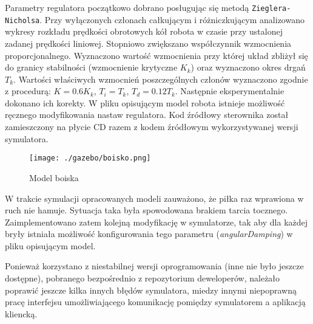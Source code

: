 	Parametry regulatora początkowo dobrano posługując się metodą \texttt{Zieglera-Nicholsa}. Przy wyłączonych członach całkującym i różniczkującym analizowano wykresy rozkładu
	prędkości obrotowych kół robota w czasie przy ustalonej zadanej prędkości liniowej. Stopniowo zwiększano współczynnik wzmocnienia proporcjonalnego. Wyznaczono wartość wzmocnienia
	przy której układ zbliżył się do granicy stabilności (wzmocnienie krytyczne $K_k$) oraz wyznaczono okres drgań $T_k$. 
	Wartości właściwych wzmocnień poszczególnych  członów wyznaczono zgodnie z procedurą: $K=0.6K_k$, $T_i=T_k$, $T_d=0.12T_k$. Następnie eksperymentalnie dokonano ich korekty.
	W pliku opisującym model robota istnieje możliwość ręcznego modyfikowania nastaw regulatora.
	Kod źródłowy sterownika został zamieszczony na płycie CD razem z kodem źródłowym wykorzystywanej wersji symulatora.	
	\begin{figure}[H]
	\centering
	\texttt{[image: ./gazebo/boisko.png]}
	\caption{Model boiska}
	\end{figure}
	W trakcie symulacji opracowanych modeli zauważono, że piłka raz wprawiona w ruch nie hamuje. Sytuacja taka była spowodowana brakiem tarcia tocznego. Zaimplementowano zatem kolejną modyfikację w 
	symulatorze, tak aby dla każdej bryły istniała możliwość konfigurowania tego parametru (\textit{angularDamping}) w pliku opisującym model.

	Ponieważ korzystano z niestabilnej wersji oprogramowania (inne nie było jeszcze dostępne), pobranego bezpośrednio z repozytorium deweloperów, należało poprawić jeszcze kilka innych błędów symulatora,
	miedzy innymi niepoprawną pracę interfejsu umożliwiającego komunikację pomiędzy symulatorem a aplikacją kliencką.